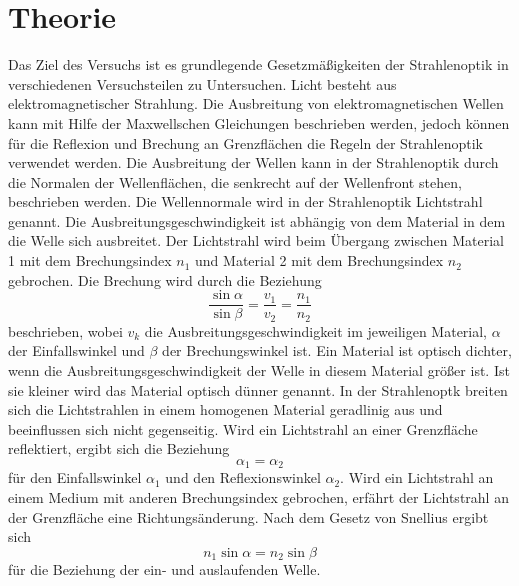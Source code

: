 \section{Theorie}
\label{sec:Theorie}
Das Ziel des Versuchs ist es grundlegende Gesetzmäßigkeiten der Strahlenoptik in verschiedenen Versuchsteilen zu Untersuchen.
Licht besteht aus elektromagnetischer Strahlung. Die Ausbreitung von elektromagnetischen Wellen kann mit Hilfe der Maxwellschen Gleichungen beschrieben werden,
jedoch können für die Reflexion und Brechung an Grenzflächen die Regeln der Strahlenoptik verwendet werden. 
Die Ausbreitung der Wellen kann in der Strahlenoptik durch die Normalen der Wellenflächen, die senkrecht auf der Wellenfront stehen, beschrieben werden. 
Die Wellennormale wird in der Strahlenoptik Lichtstrahl genannt. Die Ausbreitungsgeschwindigkeit ist abhängig von dem Material in dem die Welle sich ausbreitet.
Der Lichtstrahl wird beim Übergang zwischen Material 1 mit dem Brechungsindex $n_1$ und Material 2 mit dem Brechungsindex $n_2$ gebrochen. Die Brechung wird durch die Beziehung
\begin{equation}
    \frac{\sin \alpha}{\sin \beta} = \frac{v_1}{v_2}= \frac{n_1}{n_2}
    \label{eqn:brech}
\end{equation}
beschrieben, wobei $v_k$ die Ausbreitungsgeschwindigkeit im jeweiligen Material, $\alpha$ der Einfallswinkel und $\beta$ der Brechungswinkel ist.
Ein Material ist optisch dichter, wenn die Ausbreitungsgeschwindigkeit der Welle in diesem Material größer ist. Ist sie kleiner wird das Material optisch dünner genannt.
In der Strahlenoptk breiten sich  die Lichtstrahlen in einem homogenen Material geradlinig aus und beeinflussen sich nicht gegenseitig.
Wird ein Lichtstrahl an einer Grenzfläche reflektiert, ergibt sich die Beziehung
\begin{equation}
    \alpha_1=\alpha_2
    \label{eqn:refl}
\end{equation}
für den Einfallswinkel $\alpha_1$ und den Reflexionswinkel $\alpha_2$.
Wird ein Lichtstrahl an einem Medium mit anderen Brechungsindex gebrochen, erfährt der Lichtstrahl an der Grenzfläche eine Richtungsänderung.
Nach dem Gesetz von Snellius ergibt sich
\begin{equation}
    n_1 \sin \alpha = n_2 \sin \beta
    \label{eqn:brechung}
\end{equation}
für die Beziehung der ein- und auslaufenden Welle.
